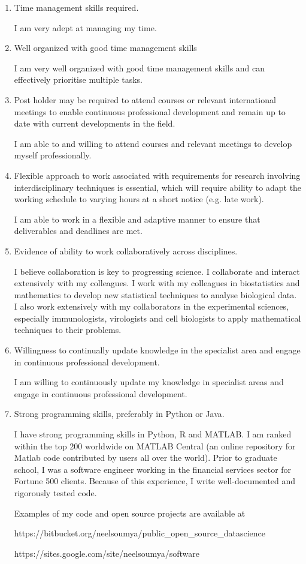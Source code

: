 \documentclass[10pt]{article}
\begin{document}
\begin{enumerate}
\item Time management skills required.

I am very adept at managing my time.


\item  Well organized with good time management skills 

I am very well organized with good time management skills and can effectively prioritise multiple tasks.

\item Post holder may be required to attend courses or relevant international meetings to enable continuous professional development and remain up to date with current developments in the field.

I am able to and willing to attend courses and relevant meetings to develop myself professionally.


\item Flexible approach to work associated with requirements for research involving interdisciplinary techniques is essential, which will require ability to adapt the working schedule to varying hours at a short notice (e.g. late work).

I am able to work in a flexible and adaptive manner to ensure that deliverables and deadlines are met.




\item Evidence of ability to work collaboratively across disciplines.


I believe collaboration is key to progressing science. I collaborate and interact extensively with my colleagues. I work with my colleagues in biostatistics and mathematics to develop new statistical techniques to analyse biological data. I also work extensively with my collaborators in the experimental sciences, especially immunologists, virologists and cell biologists to apply mathematical techniques to their problems.


\item Willingness to continually update knowledge in the specialist area and engage in continuous professional development.

I am willing to continuously update my knowledge in specialist areas and engage in continuous professional development.


\item Strong programming skills, preferably in Python or Java.

I have strong programming skills in Python, R and MATLAB.
I am ranked within the top 200 worldwide on MATLAB Central (an online repository for Matlab code contributed by users all over the world). Prior to graduate school, I was a software engineer working in the financial services sector for Fortune 500 clients. Because of this experience, I write well-documented and rigorously tested code.

Examples of my code and open source projects are available at

https://bitbucket.org/neelsoumya/public\_open\_source\_datascience

https://sites.google.com/site/neelsoumya/software


\end{enumerate}
\end{document}
